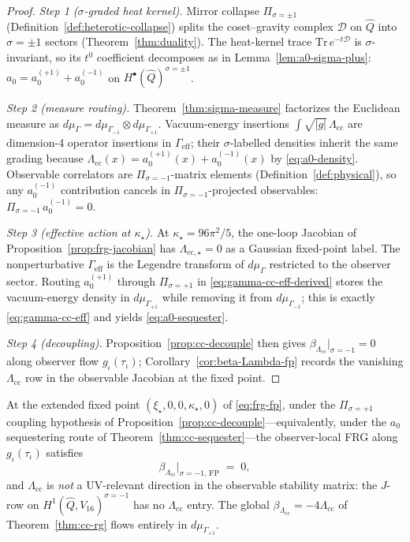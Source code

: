 \begin{proof}
\emph{Step 1 ($\sigma$-graded heat kernel).}
Mirror collapse $\Pi_{\sigma=\pm1}$
(Definition~\ref{def:heterotic-collapse}) splits the coset--gravity complex
$\mathcal{D}$ on $\hat Q$ into $\sigma=\pm1$ sectors
(Theorem~\ref{thm:duality}). The heat-kernel trace
$\mathrm{Tr}\,e^{-t\mathcal{D}}$ is $\sigma$-invariant, so its $t^0$
coefficient decomposes as in Lemma~\ref{lem:a0-sigma-plus}:
$a_0=a_0^{(+1)}+a_0^{(-1)}$ on
$H^\bullet(\hat Q)^{\sigma=\pm1}$.

\emph{Step 2 (measure routing).}
Theorem~\ref{thm:sigma-measure} factorizes the Euclidean measure as
$d\mu_\Gamma=d\mu_{\Gamma_{-1}}\otimes d\mu_{\Gamma_{+1}}$.
Vacuum-energy insertions $\int\sqrt{|g|}\,\Lambda_{\mathrm{cc}}$ are
dimension-4 operator insertions in $\Gamma_{\mathrm{eff}}$; their
$\sigma$-labelled densities inherit the same grading because
$\Lambda_{\mathrm{cc}}(x)=a_0^{(+1)}(x)+a_0^{(-1)}(x)$ by
\eqref{eq:a0-density}. Observable correlators are $\Pi_{\sigma=-1}$-matrix
elements (Definition~\ref{def:physical}), so any $a_0^{(-1)}$ contribution
cancels in $\Pi_{\sigma=-1}$-projected observables:
$\Pi_{\sigma=-1}\,a_0^{(-1)}=0$.

\emph{Step 3 (effective action at $\kappa_\star$).}
At $\kappa_\star=96\pi^2/5$, the one-loop Jacobian of
Proposition~\ref{prop:frg-jacobian} has
$\Lambda_{\mathrm{cc},\star}=0$ as a Gaussian fixed-point label. The
nonperturbative $\Gamma_{\mathrm{eff}}$ is the Legendre transform of
$d\mu_\Gamma$ restricted to the observer sector. Routing
$a_0^{(+1)}$ through $\Pi_{\sigma=+1}$ in \eqref{eq:gamma-cc-eff-derived}
stores the vacuum-energy density in $d\mu_{\Gamma_{+1}}$ while removing it
from $d\mu_{\Gamma_{-1}}$; this is exactly \eqref{eq:gamma-cc-eff} and
yields \eqref{eq:a0-sequester}.

\emph{Step 4 (decoupling).}
Proposition~\ref{prop:cc-decouple} then gives
$\beta_{\Lambda_{\mathrm{cc}}}|_{\sigma=-1}=0$ along observer flow
$g_\iota(\tau_\iota)$; Corollary~\ref{cor:beta-Lambda-fp} records the
vanishing $\Lambda_{\mathrm{cc}}$ row in the observable Jacobian at the
fixed point.
\end{proof}

\begin{corollary}
\label{cor:beta-Lambda-fp}
At the extended fixed point $(\xi_\star,0,0,\kappa_\star,0)$ of
\eqref{eq:frg-fp}, under the $\Pi_{\sigma=+1}$ coupling hypothesis of
Proposition~\ref{prop:cc-decouple}---equivalently, under the $a_0$
sequestering route of Theorem~\ref{thm:cc-sequester}---the
observer-local FRG along $g_\iota(\tau_\iota)$ satisfies
\begin{equation}\label{eq:beta-Lambda-obs-fp}
  \beta_{\Lambda_{\mathrm{cc}}}\Big|_{\sigma=-1,\,\mathrm{FP}}
  \;=\;
  0,
\end{equation}
and $\Lambda_{\mathrm{cc}}$ is \emph{not} a UV-relevant direction in the
observable stability matrix: the $J$-row on
$H^1(\hat Q,V_{16})^{\sigma=-1}$ has no $\Lambda_{\mathrm{cc}}$ entry. The
global $\beta_{\Lambda_{\mathrm{cc}}}=-4\Lambda_{\mathrm{cc}}$ of
Theorem~\ref{thm:cc-rg} flows entirely in $d\mu_{\Gamma_{+1}}$.
\end{corollary}

